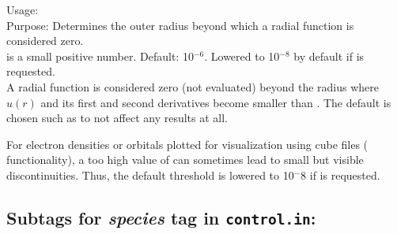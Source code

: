 




{
  \noindent
  Usage:   \\[1.0ex]
  Purpose: Determines the outer radius beyond which a radial function
  is considered zero. \\[1.0ex]
   is a small positive number. Default: 10$^{-6}$.
  Lowered to 10$^{-8}$ by default if 
   is requested. \\ 
}
A radial function is considered zero (not evaluated) beyond the radius
where $u(r)$ and its first and second derivatives become smaller than
. The default is chosen such as to not affect any
results at all.

For electron densities or orbitals plotted for visualization using
cube files (  functionality), a too
high value of  can sometimes lead to small
but visible discontinuities. Thus, the default threshold is
lowered to 10$^-8$ if   is requested.


\newpage

\subsection*{Subtags for \emph{species} tag in \texttt{control.in}:}

